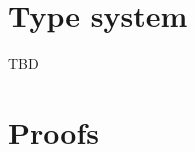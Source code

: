 \documentclass[12pt]{memoir}
\begin{document}
\chapter{Type system}

TBD

\appendix

\chapter{Proofs}

\backmatter

\printbibliography
\end{document}

